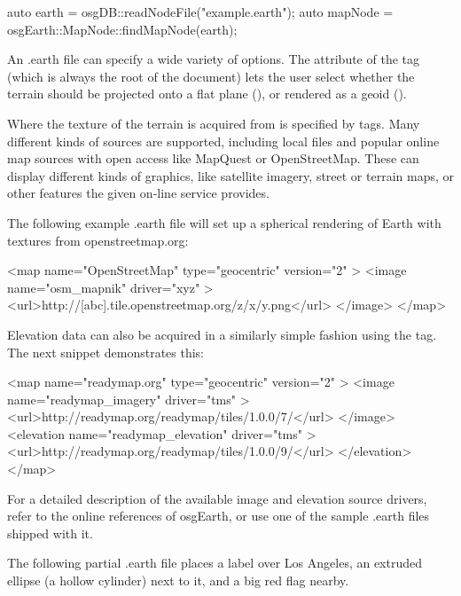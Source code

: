 \begin{cpp}
auto earth = osgDB::readNodeFile("example.earth");
auto mapNode = osgEarth::MapNode::findMapNode(earth);
\end{cpp}

An .earth file can specify a wide variety of options. The  attribute
of the  tag (which is always the root of the document) lets the user
select whether the terrain should be projected onto a flat plane (),
or rendered as a geoid ().

Where the texture of the terrain is acquired from is specified by 
tags. Many different kinds of sources are supported, including local files and
popular online map sources with open access like MapQuest or OpenStreetMap.
These can display different kinds of graphics, like satellite imagery, street
or terrain maps, or other features the given on-line service provides.

The following example .earth file will set up a spherical rendering of Earth
with textures from openstreetmap.org:

\begin{filelisting}
<map name="OpenStreetMap" type="geocentric" version="2" >
    <image name="osm_mapnik" driver="xyz" >
        <url>http://[abc].tile.openstreetmap.org/{z}/{x}/{y}.png</url>
    </image>
</map>
\end{filelisting}

Elevation data can also be acquired in a similarly simple fashion using the
 tag. The next snippet demonstrates this:

\begin{filelisting}
<map name="readymap.org" type="geocentric" version="2" >
    <image name="readymap_imagery" driver="tms" >
        <url>http://readymap.org/readymap/tiles/1.0.0/7/</url>
    </image>
    <elevation name="readymap_elevation" driver="tms" >
        <url>http://readymap.org/readymap/tiles/1.0.0/9/</url>
    </elevation>
</map>
\end{filelisting}

For a detailed description of the available image and elevation source drivers,
refer to the online references of osgEarth, or use one of the sample .earth
files shipped with it.

The following partial .earth file places a label over Los Angeles, an extruded
ellipse (a hollow cylinder) next to it, and a big red flag nearby.

